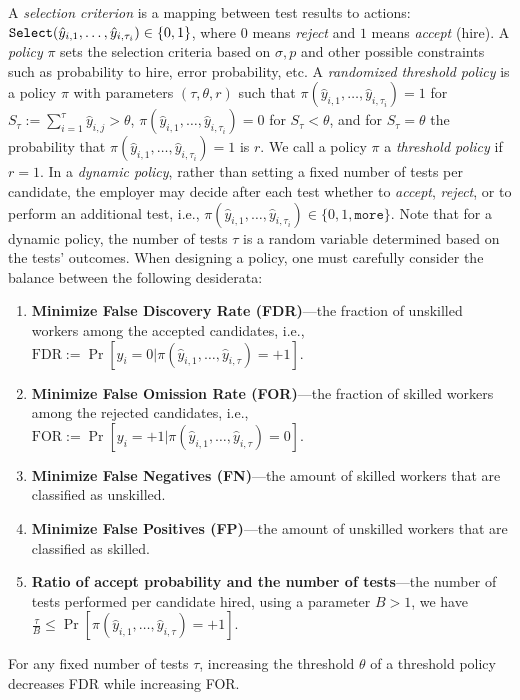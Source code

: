 A \emph{selection criterion} is a mapping 
between test results to actions: $\text{\tt Select}(\hat{y}_{i,1},\dots,\hat{y}_{i,\tau_i}) \in \{0,1\}$, where $0$ means \emph{reject} 
and $1$ means \emph{accept} (hire). 
A \emph{policy} $\pi$ sets the selection criteria 
based on $\sigma, p$ and other possible constraints 
such as probability to hire, error probability, etc. 
A \emph{randomized threshold policy} is a policy $\pi$ with parameters $(\tau,\theta,r)$ such that $\pi(\hat{y}_{i,1},\dots,\hat{y}_{i,\tau_i})=1$ 
for $S_{\tau}:=\sum_{i=1}^{\tau} \hat{y}_{i,j} > \theta$,
$\pi(\hat{y}_{i,1},\dots,\hat{y}_{i,\tau_i})=0$ 
for $S_{\tau}< \theta$, and for $S_{\tau}= \theta$ the probability that $\pi(\hat{y}_{i,1},\dots,\hat{y}_{i,\tau_i})=1$ is $r$.
We call a policy $\pi$ a \emph{threshold policy} if $r=1$.
In a \textit{dynamic policy}, 
rather than setting a fixed number of tests per candidate,
the employer may decide after each test whether to 
\emph{accept}, \emph{reject}, 
or to perform an additional test, i.e., $\pi(\hat{y}_{i,1},\dots,\hat{y}_{i,\tau_i}) \in \{0,1,\texttt{more}\}$. 
Note that for a dynamic policy, the number of tests $\tau$
is a random variable determined based on the tests' outcomes.
When designing a policy, one must carefully consider 
the balance between the following desiderata:
\begin{enumerate}
\item \textbf{Minimize False Discovery Rate (FDR)}---the fraction of unskilled workers 
among the accepted candidates, i.e., $\text{FDR}:=\Pr[y_i=0|\pi(\hat{y}_{i,1},\dots,\hat{y}_{i,\tau})=+1]$.
\item \textbf{Minimize False Omission Rate (FOR)}---the fraction of skilled workers among the rejected candidates, i.e., $\text{FOR}:=\Pr[y_i=+1|\pi(\hat{y}_{i,1},\dots,\hat{y}_{i,\tau})=0]$. 
\item \textbf{Minimize False Negatives (FN)}---the amount of skilled workers that are classified as unskilled.
\item \textbf{Minimize False Positives (FP)}---the amount of unskilled workers that are classified as skilled.
\item \textbf{Ratio of accept probability and the number of tests}---the number 
of tests performed per candidate hired, 
using a parameter $B>1$, we have  $\frac{\tau}{B} \leq \Pr[\pi(\hat{y}_{i,1},\dots,\hat{y}_{i,\tau})=+1]$.
\end{enumerate}
For any fixed 
number of tests $\tau$, 
increasing the threshold $\theta$ of a threshold policy
decreases FDR while increasing FOR.

